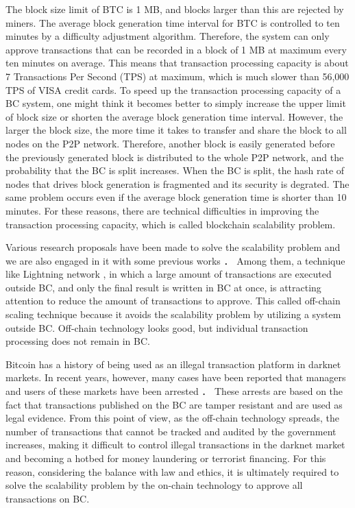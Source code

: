 \documentclass[graybox]{svmult}
\begin{document}
The block size limit of BTC is 1 MB, and blocks larger than this are rejected by miners. 
The average block generation time interval for BTC is controlled to ten minutes by a difficulty adjustment algorithm. 
Therefore, the system can only approve transactions that can be recorded in a block of 1 MB at maximum every ten minutes on average. 
This means that transaction processing capacity is about 7 Transactions Per Second (TPS) at maximum, which is much slower than 56,000 TPS of VISA credit cards. 
To speed up the transaction processing capacity of a BC system, one might think it becomes better to simply increase the upper limit of block size or shorten the average block generation time interval. 
However, the larger the block size, the more time it takes to transfer and share the block to all nodes on the P2P network. 
Therefore, another block is easily generated before the previously generated block is distributed to the whole P2P network, and the probability that the BC is split increases. 
When the BC is split, the hash rate of nodes that drives block generation is fragmented and its security is degrated. 
The same problem occurs even if the average block generation time is shorter than 10 minutes. 
For these reasons, there are technical difficulties in improving the transaction processing capacity, which is called blockchain scalability problem.


Various research proposals have been made to solve the scalability problem \cite{ZHZB2020} and we are also engaged in it with some previous works \cite{Fujihara2018,Fujihara2019,Fujihara2020,YF2021a,YF2021b}．
Among them, a technique like Lightning network \cite{PD2016}, in which a large amount of transactions are executed outside BC, and only the final result is written in BC at once, is attracting attention to reduce the amount of transactions to approve. 
This called off-chain scaling technique because it avoids the scalability problem by utilizing a system outside BC. 
Off-chain technology looks good, but individual transaction processing does not remain in BC.


Bitcoin has a history of being used as an illegal transaction platform in darknet markets.
In recent years, however, many cases have been reported that managers and users of these markets have been arrested \cite{silkroad,alphabay,welcome2video}．
These arrests are based on the fact that transactions published on the BC are tamper resistant and are used as legal evidence.
From this point of view, as the off-chain technology spreads, the number of transactions that cannot be tracked and audited by the government increases, making it difficult to control illegal transactions in the darknet market and becoming a hotbed for money laundering or terrorist financing.
For this reason, considering the balance with law and ethics, it is ultimately required to solve the scalability problem by the on-chain technology to approve all transactions on BC. 
\end{document}
